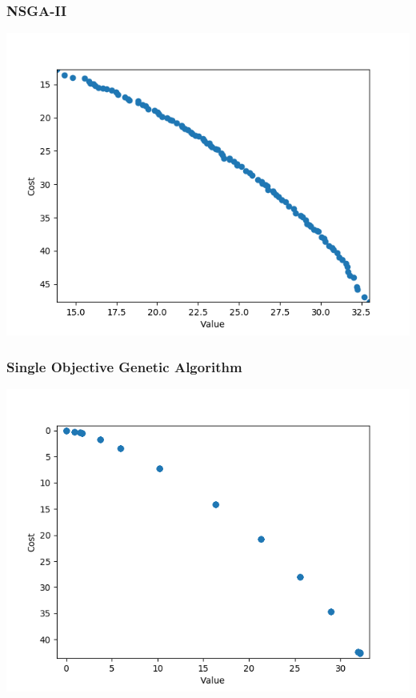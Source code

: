 \documentclass[12pt]{article}
\begin{document}
\subsubsection{NSGA-II}
\includegraphics[width=\linewidth]{res/multi_obj.png}

\subsubsection{Single Objective Genetic Algorithm}
\includegraphics[width=\linewidth]{res/single_obj.png}
\end{document}
